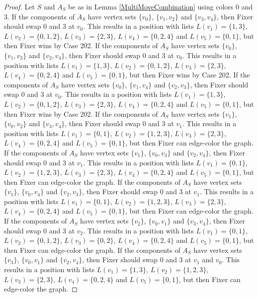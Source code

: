 \documentclass[12pt]{amsart}
\theoremstyle{plain}
\theoremstyle{definition}
\theoremstyle{remark}
\begin{document}
\begin{proof}
Let $S$ and $A_S$ be as in Lemma \ref{MultiMoveCombination} using colors $0$ and $3$. If the components of $A_S$ have vertex sets $\{v_0\}$, $\{v_1, v_2\}$ and $\{v_3, v_4\}$, then Fixer should swap 0 and 3 at $v_0$. This results in a position with lists $L(v_1) = \{1, 3\}$, $L(v_2) = \{0, 1, 2\}$, $L(v_3) = \{2, 3\}$, $L(v_4) = \{0, 2, 4\}$ and $L(v_5) = \{0, 1\}$, but then Fixer wins by Case 202.
If the components of $A_S$ have vertex sets $\{v_0\}$, $\{v_1, v_3\}$ and $\{v_2, v_4\}$, then Fixer should swap 0 and 3 at $v_0$. This results in a position with lists $L(v_1) = \{1, 3\}$, $L(v_2) = \{0, 1, 2\}$, $L(v_3) = \{2, 3\}$, $L(v_4) = \{0, 2, 4\}$ and $L(v_5) = \{0, 1\}$, but then Fixer wins by Case 202.
If the components of $A_S$ have vertex sets $\{v_0\}$, $\{v_1, v_4\}$ and $\{v_2, v_3\}$, then Fixer should swap 0 and 3 at $v_0$. This results in a position with lists $L(v_1) = \{1, 3\}$, $L(v_2) = \{0, 1, 2\}$, $L(v_3) = \{2, 3\}$, $L(v_4) = \{0, 2, 4\}$ and $L(v_5) = \{0, 1\}$, but then Fixer wins by Case 202.
If the components of $A_S$ have vertex sets $\{v_1\}$, $\{v_0, v_2\}$ and $\{v_3, v_4\}$, then Fixer should swap 0 and 3 at $v_1$. This results in a position with lists $L(v_1) = \{0, 1\}$, $L(v_2) = \{1, 2, 3\}$, $L(v_3) = \{2, 3\}$, $L(v_4) = \{0, 2, 4\}$ and $L(v_5) = \{0, 1\}$, but then Fixer can edge-color the graph.
If the components of $A_S$ have vertex sets $\{v_1\}$, $\{v_0, v_3\}$ and $\{v_2, v_4\}$, then Fixer should swap 0 and 3 at $v_1$. This results in a position with lists $L(v_1) = \{0, 1\}$, $L(v_2) = \{1, 2, 3\}$, $L(v_3) = \{2, 3\}$, $L(v_4) = \{0, 2, 4\}$ and $L(v_5) = \{0, 1\}$, but then Fixer can edge-color the graph.
If the components of $A_S$ have vertex sets $\{v_1\}$, $\{v_0, v_4\}$ and $\{v_2, v_3\}$, then Fixer should swap 0 and 3 at $v_1$. This results in a position with lists $L(v_1) = \{0, 1\}$, $L(v_2) = \{1, 2, 3\}$, $L(v_3) = \{2, 3\}$, $L(v_4) = \{0, 2, 4\}$ and $L(v_5) = \{0, 1\}$, but then Fixer can edge-color the graph.
If the components of $A_S$ have vertex sets $\{v_2\}$, $\{v_0, v_1\}$ and $\{v_3, v_4\}$, then Fixer should swap 0 and 3 at $v_2$. This results in a position with lists $L(v_1) = \{0, 1\}$, $L(v_2) = \{0, 1, 2\}$, $L(v_3) = \{0, 2\}$, $L(v_4) = \{0, 2, 4\}$ and $L(v_5) = \{0, 1\}$, but then Fixer can edge-color the graph.
If the components of $A_S$ have vertex sets $\{v_3\}$, $\{v_0, v_1\}$ and $\{v_2, v_4\}$, then Fixer should swap 0 and 3 at $v_1$ and $v_0$. This results in a position with lists $L(v_1) = \{1, 3\}$, $L(v_2) = \{1, 2, 3\}$, $L(v_3) = \{2, 3\}$, $L(v_4) = \{0, 2, 4\}$ and $L(v_5) = \{0, 1\}$, but then Fixer can edge-color the graph.

\end{proof}
\end{document}
